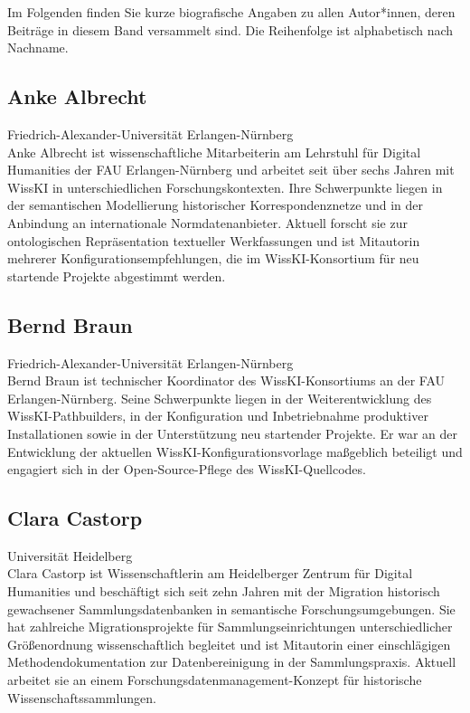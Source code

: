 
Im Folgenden finden Sie kurze biografische Angaben zu allen Autor*innen, deren Beiträge in diesem Band versammelt sind. Die Reihenfolge ist alphabetisch nach Nachname.

\subsection*{Anke Albrecht}
\noindent\small Friedrich-Alexander-Universität Erlangen-Nürnberg \\
Anke Albrecht ist wissenschaftliche Mitarbeiterin am Lehrstuhl für Digital Humanities der FAU Erlangen-Nürnberg und arbeitet seit über sechs Jahren mit WissKI in unterschiedlichen Forschungskontexten. Ihre Schwerpunkte liegen in der semantischen Modellierung historischer Korrespondenznetze und in der Anbindung an internationale Normdatenanbieter. Aktuell forscht sie zur ontologischen Repräsentation textueller Werkfassungen und ist Mitautorin mehrerer Konfigurationsempfehlungen, die im WissKI-Konsortium für neu startende Projekte abgestimmt werden.

\subsection*{Bernd Braun}
\noindent\small Friedrich-Alexander-Universität Erlangen-Nürnberg \\
Bernd Braun ist technischer Koordinator des WissKI-Konsortiums an der FAU Erlangen-Nürnberg. Seine Schwerpunkte liegen in der Weiterentwicklung des WissKI-Pathbuilders, in der Konfiguration und Inbetriebnahme produktiver Installationen sowie in der Unterstützung neu startender Projekte. Er war an der Entwicklung der aktuellen WissKI-Konfigurationsvorlage maßgeblich beteiligt und engagiert sich in der Open-Source-Pflege des WissKI-Quellcodes.

\subsection*{Clara Castorp}
\noindent\small Universität Heidelberg \\
Clara Castorp ist Wissenschaftlerin am Heidelberger Zentrum für Digital Humanities und beschäftigt sich seit zehn Jahren mit der Migration historisch gewachsener Sammlungsdatenbanken in semantische Forschungsumgebungen. Sie hat zahlreiche Migrationsprojekte für Sammlungseinrichtungen unterschiedlicher Größenordnung wissenschaftlich begleitet und ist Mitautorin einer einschlägigen Methodendokumentation zur Datenbereinigung in der Sammlungspraxis. Aktuell arbeitet sie an einem Forschungsdatenmanagement-Konzept für historische Wissenschaftssammlungen.

